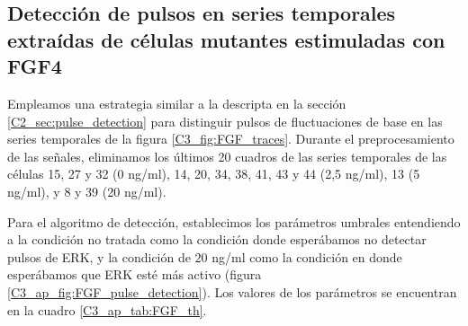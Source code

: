 \documentclass[./main.tex]{subfiles}
\begin{document}
\begin{subappendices}
\section{Detección de pulsos en series temporales extraídas de células mutantes estimuladas con FGF4}
\label{C3_ap:FGF_pulse_detection}


Empleamos una estrategia similar a la descripta en la sección \ref{C2_sec:pulse_detection} para distinguir pulsos de fluctuaciones de base en las series temporales de la figura \ref{C3_fig:FGF_traces}. Durante el preprocesamiento de las señales, eliminamos los últimos 20 cuadros de las series temporales de las células 15, 27 y 32 (0 ng/ml), 14, 20, 34, 38, 41, 43 y 44 (2,5 ng/ml), 13 (5 ng/ml), y 8 y 39 (20 ng/ml). 

Para el algoritmo de detección, establecimos los parámetros umbrales entendiendo a la condición no tratada como la condición donde esperábamos no detectar pulsos de ERK, y la condición de $20$ ng/ml como la condición en donde esperábamos que ERK esté más activo (figura \ref{C3_ap_fig:FGF_pulse_detection}). Los valores de los parámetros se encuentran en la cuadro \ref{C3_ap_tab:FGF_th}.


\end{subappendices}
\end{document}
